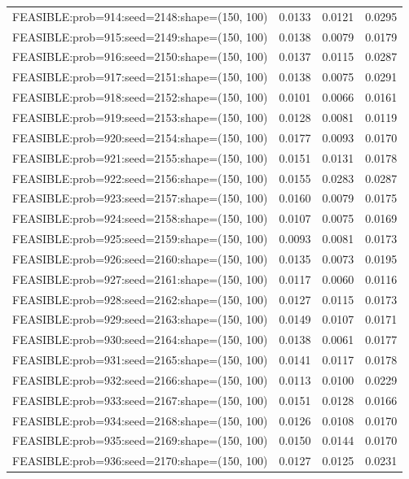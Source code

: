 \begin{longtable}{lccc}
FEASIBLE:prob=914:seed=2148:shape=(150, 100) &   0.0133 & 0.0121 & 0.0295 \\
FEASIBLE:prob=915:seed=2149:shape=(150, 100) &   0.0138 & 0.0079 & 0.0179 \\
FEASIBLE:prob=916:seed=2150:shape=(150, 100) &   0.0137 & 0.0115 & 0.0287 \\
FEASIBLE:prob=917:seed=2151:shape=(150, 100) &   0.0138 & 0.0075 & 0.0291 \\
FEASIBLE:prob=918:seed=2152:shape=(150, 100) &   0.0101 & 0.0066 & 0.0161 \\
FEASIBLE:prob=919:seed=2153:shape=(150, 100) &   0.0128 & 0.0081 & 0.0119 \\
FEASIBLE:prob=920:seed=2154:shape=(150, 100) &   0.0177 & 0.0093 & 0.0170 \\
FEASIBLE:prob=921:seed=2155:shape=(150, 100) &   0.0151 & 0.0131 & 0.0178 \\
FEASIBLE:prob=922:seed=2156:shape=(150, 100) &   0.0155 & 0.0283 & 0.0287 \\
FEASIBLE:prob=923:seed=2157:shape=(150, 100) &   0.0160 & 0.0079 & 0.0175 \\
FEASIBLE:prob=924:seed=2158:shape=(150, 100) &   0.0107 & 0.0075 & 0.0169 \\
FEASIBLE:prob=925:seed=2159:shape=(150, 100) &   0.0093 & 0.0081 & 0.0173 \\
FEASIBLE:prob=926:seed=2160:shape=(150, 100) &   0.0135 & 0.0073 & 0.0195 \\
FEASIBLE:prob=927:seed=2161:shape=(150, 100) &   0.0117 & 0.0060 & 0.0116 \\
FEASIBLE:prob=928:seed=2162:shape=(150, 100) &   0.0127 & 0.0115 & 0.0173 \\
FEASIBLE:prob=929:seed=2163:shape=(150, 100) &   0.0149 & 0.0107 & 0.0171 \\
FEASIBLE:prob=930:seed=2164:shape=(150, 100) &   0.0138 & 0.0061 & 0.0177 \\
FEASIBLE:prob=931:seed=2165:shape=(150, 100) &   0.0141 & 0.0117 & 0.0178 \\
FEASIBLE:prob=932:seed=2166:shape=(150, 100) &   0.0113 & 0.0100 & 0.0229 \\
FEASIBLE:prob=933:seed=2167:shape=(150, 100) &   0.0151 & 0.0128 & 0.0166 \\
FEASIBLE:prob=934:seed=2168:shape=(150, 100) &   0.0126 & 0.0108 & 0.0170 \\
FEASIBLE:prob=935:seed=2169:shape=(150, 100) &   0.0150 & 0.0144 & 0.0170 \\
FEASIBLE:prob=936:seed=2170:shape=(150, 100) &   0.0127 & 0.0125 & 0.0231 \\

\end{longtable}
